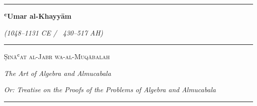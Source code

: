 
\newcommand{\vs}{\vspace{0.5em}}




\begin{titlepage}

\begin{center}

\vspace*{1.5cm}
{
\color{titlecolor}
\rule{\textwidth}{1.5pt}}

\vspace{1cm}

{\Huge\bfseries
\color{titlecolor} ʿUmar al-Khayyām}

\vspace{0.5cm}

{\Large\itshape (1048--1131 CE / ~430--517 AH)}

\vspace{1.5cm}

{
\color{titlecolor}
\rule{0.7\textwidth}{0.8pt}}

\vspace{1.5cm}

\begin{Arabic}

{
}

\end{Arabic}

\vspace{0.8cm}

{\LARGE\scshape Ṣināʿat al-Jabr wa-al-Muqābalah}

\vspace{0.3cm}

{\large
\textit{The Art of Algebra and Almucabala}}

\vspace{0.3cm}

{\normalsize
\textit{Or: Treatise on the Proofs of the Problems of Algebra and Almucabala}}

\vspace{1.5cm}

{
\color{titlecolor}
\rule{0.7\textwidth}{0.8pt}}

\vspace{1cm}


\end{center}
\end{titlepage}
